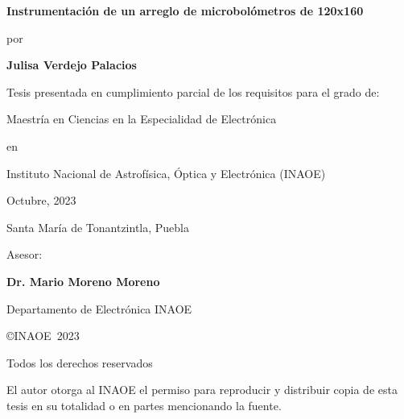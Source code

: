 \documentclass[12pt,a4paper]{report}
\newcommand{\Ptitle}{Instrumentación de un arreglo de microbolómetros de 120x160}
\newcommand{\Pauthor}{Julisa Verdejo Palacios}
\newcommand{\Pdegree}{Maestría en Ciencias en la Especialidad de Electrónica}
\newcommand{\Padvisor}{Dr. Mario Moreno Moreno}
\newcommand{\Pdepartmentadvisor}{Departamento de Electrónica INAOE}
\newcommand{\Pinstitution}{Instituto Nacional de Astrofísica, Óptica y Electrónica (INAOE)}
\newcommand{\Pmonth}{Octubre, }
\newcommand{\Pyear}{2023}
\newcommand{\Paddres}{Santa María de Tonantzintla, Puebla}
\newlength{\vertical}\setlength{\vertical}{0.8cm}
\begin{document}
\begin{titlepage}
    \begin{center}
        {\Large\bf\Ptitle\par}
        \vspace{\vertical}
        
        {por\par}
        \vspace{\vertical}
        
        {\bf\Pauthor\par}
        \vspace{\vertical}
        
        {Tesis presentada en cumplimiento parcial de los requisitos para el grado de:\par}
        \vspace{\vertical}
        
        {\Pdegree\par}
        \vspace{\vertical}
        
        {en\par}
        \vspace{\vertical}
        
        {\Pinstitution\par}
        \vspace{\vertical}
        
        {\Pmonth\Pyear\par}
        \vspace{\vertical}
    
        {\Paddres\par}        
        \vspace{\vertical}
        
        {Asesor:\par}
        \vspace{\vertical}
        
        {\bf\Padvisor\par}
        {\Pdepartmentadvisor\par}
        \vspace{\vertical}
        
        {\copyright INAOE~\Pyear\par}
        {Todos los derechos reservados\par}
        {El autor otorga al INAOE el permiso para reproducir y distribuir copia de esta tesis en su totalidad o en partes mencionando la
fuente.\par}
    \end{center}

\end{titlepage}

\end{document}
